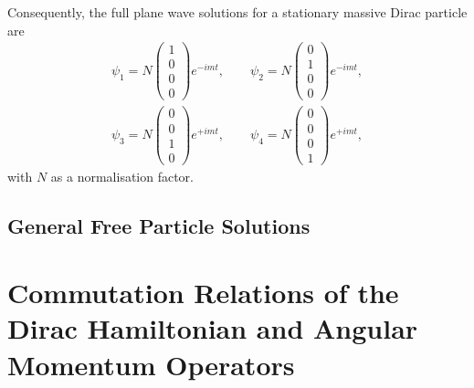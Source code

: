 \documentclass[11pt]{penrose}
\begin{document}
Consequently, the full plane wave solutions for a stationary massive Dirac particle are
\begin{gather}
    \psi_1 = N \begin{pmatrix}1 \\ 0 \\ 0 \\ 0\end{pmatrix} e^{-imt}, \qquad
    \psi_2 = N \begin{pmatrix}0 \\ 1 \\ 0 \\ 0\end{pmatrix} e^{-imt},\\
    \psi_3 = N \begin{pmatrix}0 \\ 0 \\ 1 \\ 0\end{pmatrix} e^{+imt}, \qquad
    \psi_4 = N \begin{pmatrix}0 \\ 0 \\ 0 \\ 1\end{pmatrix} e^{+imt},
\end{gather}
with $N$ as a normalisation factor.

\subsection{General Free Particle Solutions}



\appendix
\section{Commutation Relations of the Dirac Hamiltonian and Angular Momentum Operators}
\end{document}
